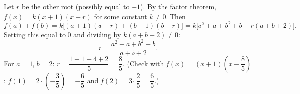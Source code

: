 Let $r$ be the other root (possibly equal to $-1$). By the factor theorem, $f(x)=k(x+1)(x-r)$ for some constant $k\ne0$. Then
\[f(a)+f(b)=k\bigl[(a+1)(a-r)+(b+1)(b-r)\bigr]=k\bigl[a^2+a+b^2+b-r(a+b+2)\bigr].\]
Setting this equal to $0$ and dividing by $k(a+b+2)\ne0$:
\[\boxed{r=\dfrac{a^2+a+b^2+b}{a+b+2}}.\]
For $a=1$, $b=2$: $r=\dfrac{1+1+4+2}{5}=\dfrac85$. (Check with $f(x)=(x+1)\left(x-\dfrac85\right)$: $f(1)=2\cdot\left(-\dfrac35\right)=-\dfrac65$ and $f(2)=3\cdot\dfrac25=\dfrac65$.)
